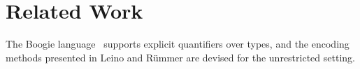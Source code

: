 \section{Related Work}
\label{sec_related_work}

The Boogie language~\cite{Barnett06boogie} supports explicit quantifiers over
types, and the encoding methods presented in Leino and R\"ummer
\cite{leino10tacas} are devised for the unrestricted setting.
